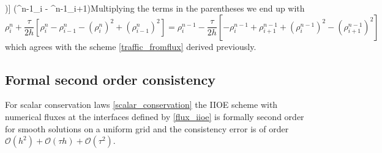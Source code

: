 \documentclass[../include.tex]{subfiles}
\begin{document}
\right)\right] \left(\rho^{n-1}_i - \rho^{n-1}_{i+1}\right)\]Multiplying the terms in the parentheses we end up with\[\rho^n_i + \frac{\tau}{2h} \left[\rho^n_i - \rho^n_{i-1} - (\rho^n_{i})^2 + (\rho^n_{i-1})^2\right] = \rho^{n-1}_i - \frac{\tau}{2h} \left[-\rho^{n-1}_i + \rho^{n-1}_{i+1} + (\rho^{n-1}_{i})^2 - (\rho^{n-1}_{i+1})^2\right] \]which agrees with the scheme \eqref{traffic_fromflux} derived previously.
\subsection{Formal second order consistency}

\begin{theorem}
	For scalar conservation laws \eqref{scalar_conservation} the IIOE scheme with numerical fluxes at the interfaces defined by \eqref{flux_iioe} is formally second order for smooth solutions on a uniform grid and the consistency error is of order $\mathcal{O}(h^2) + \mathcal{O}(\tau h) + \mathcal{O}(\tau^2)$.
\end{theorem}
\end{document}
